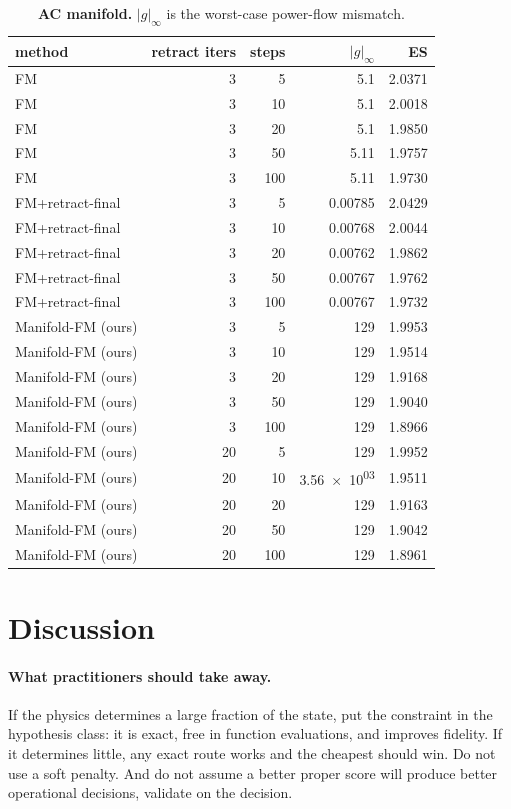 \documentclass{article}
\begin{document}
\begin{table}[t]\centering\small
\caption{\textbf{AC manifold.} $|g|_\infty$ is the worst-case power-flow mismatch.}\label{tab:ac}
\begin{tabular}{lrrrr}\toprule
method & retract iters & steps & $|g|_\infty$ & ES\\\midrule
FM & 3 & 5 & 5.1 & 2.0371\\
FM & 3 & 10 & 5.1 & 2.0018\\
FM & 3 & 20 & 5.1 & 1.9850\\
FM & 3 & 50 & 5.11 & 1.9757\\
FM & 3 & 100 & 5.11 & 1.9730\\
FM+retract-final & 3 & 5 & 0.00785 & 2.0429\\
FM+retract-final & 3 & 10 & 0.00768 & 2.0044\\
FM+retract-final & 3 & 20 & 0.00762 & 1.9862\\
FM+retract-final & 3 & 50 & 0.00767 & 1.9762\\
FM+retract-final & 3 & 100 & 0.00767 & 1.9732\\
Manifold-FM (ours) & 3 & 5 & 129 & 1.9953\\
Manifold-FM (ours) & 3 & 10 & 129 & 1.9514\\
Manifold-FM (ours) & 3 & 20 & 129 & 1.9168\\
Manifold-FM (ours) & 3 & 50 & 129 & 1.9040\\
Manifold-FM (ours) & 3 & 100 & 129 & 1.8966\\
Manifold-FM (ours) & 20 & 5 & 129 & 1.9952\\
Manifold-FM (ours) & 20 & 10 & \num{3.56e+03} & 1.9511\\
Manifold-FM (ours) & 20 & 20 & 129 & 1.9163\\
Manifold-FM (ours) & 20 & 50 & 129 & 1.9042\\
Manifold-FM (ours) & 20 & 100 & 129 & 1.8961\\
\bottomrule\end{tabular}\end{table}

\section{Discussion}\label{sec:discussion}
\paragraph{What practitioners should take away.} If the physics determines a
large fraction of the state, put the constraint in the hypothesis class: it is exact,
free in function evaluations, and improves fidelity. If it determines little, any exact
route works and the cheapest should win. Do not use a soft penalty. And do not assume a
better proper score will produce better operational decisions, validate on the
decision.
\end{document}
